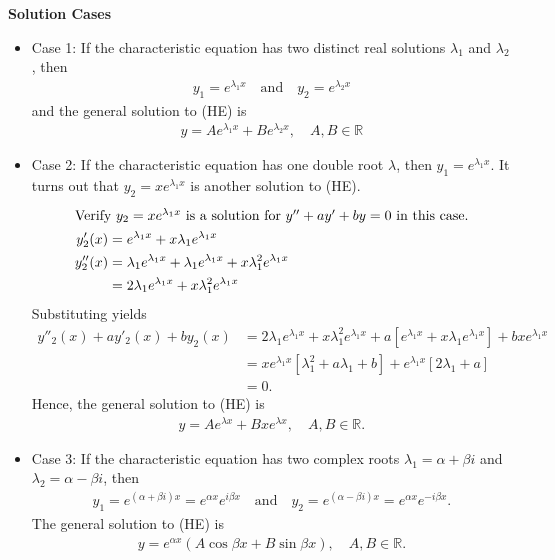 \documentclass{report}
\begin{document}
			\textbf{Solution Cases}
			\begin{itemize}
				\item Case 1: If the characteristic equation has two distinct real solutions $\lambda_1$ and $\lambda_2$, then
					\begin{align*}
						y_1 = e^{\lambda_1 x} \quad \text{and} \quad y_2 = e^{\lambda_2 x}
					\end{align*}
					and the general solution to (HE) is
					\begin{align*}
						y = Ae^{\lambda_1 x} + Be^{\lambda_2 x}, \quad A,B \in \mathbb{R}
					\end{align*}
				\item Case 2: If the characteristic equation has one double root $\lambda$, then $y_1 = e^{\lambda_1 x}$. It turns out that $y_2 = x e^{\lambda_1 x}$ is another solution to (HE).
					\begin{align*}
						\intertext{Verify $y_2 = xe^{\lambda_1 x}$ is a solution for $y'' + ay' + by = 0$ in this case.}
						y'_2(x) &= e^{\lambda_1 x} + x \lambda_1 e^{\lambda_1 x}	\\
						y''_2(x) &= \lambda_1 e^{\lambda_1 x} + \lambda_1 e^{\lambda_1 x} + x \lambda_1^2 e^{\lambda_1 x}	\\
								 &= 2 \lambda_1 e^{\lambda_1 x} + x \lambda_1^2 e^{\lambda_1 x}
					\end{align*}
					Substituting yields
					\begin{align*}
						y''_2(x) + ay'_2(x) + by_2(x) &= 2 \lambda_1 e^{\lambda_1 x} + x \lambda_1^2 e^{\lambda_1 x} + a \left[e^{\lambda_1 x} + x\lambda_1 e^{\lambda_1 x} \right] + b x e^{\lambda_1 x}	\\
													  &= x e^{\lambda_1 x} \left[\lambda_1^2 + a \lambda_1 + b\right] + e^{\lambda_1 x} \left[2\lambda_1 + a\right]	\\
													  &= 0.
					\end{align*}
					Hence, the general solution to (HE) is
					\begin{align*}
						y = Ae^{\lambda x} + Bxe^{\lambda x}, \quad A,B \in \mathbb{R}.
					\end{align*}
				\item Case 3: If the characteristic equation has two complex roots $\lambda_1 = \alpha + \beta i$ and $\lambda_2 = \alpha - \beta i$, then
					\begin{align*}
						y_1 = e^{(\alpha + \beta i)x} = e^{\alpha x} e^{i \beta x} \quad \text{and} \quad y_2 = e^{(\alpha - \beta i)x} = e^{\alpha x} e^{-i \beta x}.
					\end{align*}
					The general solution to (HE) is
					\begin{align*}
						y = e^{\alpha x} (A \cos \beta x + B \sin \beta x), \quad A,B \in \mathbb{R}.
					\end{align*}
			\end{itemize}
\end{document}
